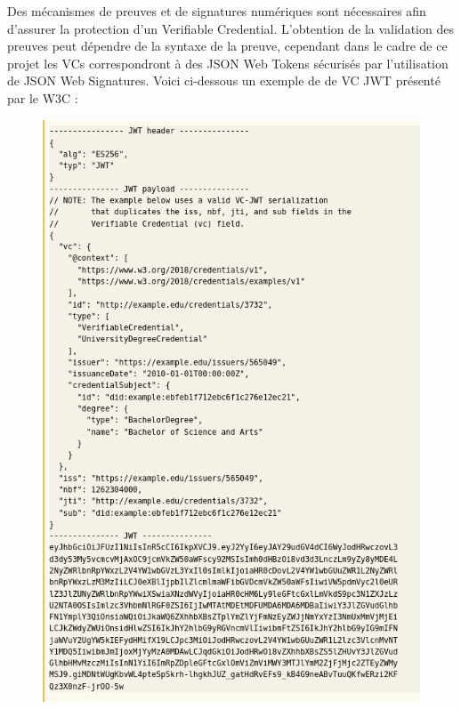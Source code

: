 \documentclass[12pt, openany]{report}
\begin{document}
\begin{flushleft}
Des mécanismes de preuves et de signatures numériques sont nécessaires afin d'assurer la protection d'un Verifiable Credential. L'obtention de la validation des preuves peut dépendre de la syntaxe de la preuve, cependant dans le cadre de ce projet les VCs correspondront à des JSON Web Tokens sécurisés par l'utilisation de JSON Web Signatures. Voici ci-dessous un exemple de de VC JWT présenté par le W3C :\\
\begin{figure}[h]
\includegraphics[scale=0.4]{vc2.png}
\centering
\end{figure}

\end{flushleft}

\newpage
\end{document}
